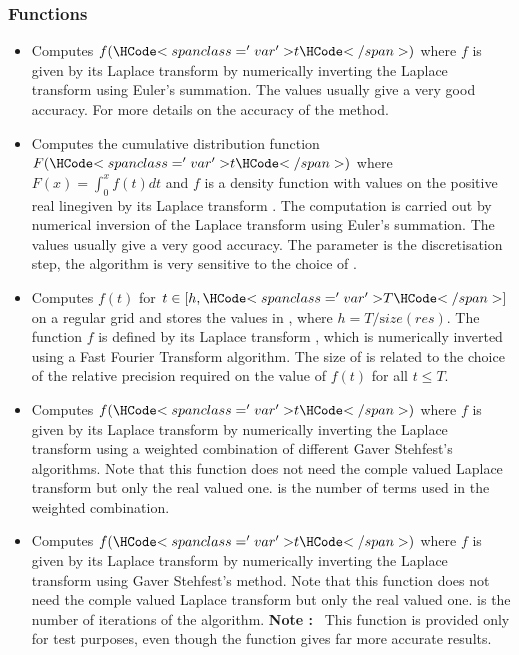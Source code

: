 \subsubsection{Functions}
\begin{itemize}
\item {}
  \sshortdescribe Computes $f(\var{t})$ where $f$ is given by its Laplace
  transform  by numerically inverting the Laplace transform using
  Euler's summation. The values  usually give a very good
  accuracy. For more details on the accuracy of the method. 

\item {}
  \sshortdescribe Computes the cumulative distribution function $F(\var{t})$
  where $F(x) = \int_0^x f(t) dt$ and $f$ is a density function with values on
  the positive real linegiven by its Laplace transform . The
  computation is carried out by numerical inversion of the Laplace transform
  using Euler's summation. The values  usually give a very
  good accuracy. The parameter  is the discretisation step, the
  algorithm is very sensitive to the choice of .

\item {}
  \sshortdescribe Computes $f(t)$ for $t \in [h, \var{T}]$ on a regular grid
  and stores the values in , where $h = T / {\mathrm size}(res)$. The
  function $f$ is defined by its Laplace transform , which is
  numerically inverted using a Fast Fourier Transform algorithm. The size of
   is related to the choice of the relative precision 
  required on the value of $f(t)$ for all $t \le T$.

\item {}
  \sshortdescribe Computes $f(\var{t})$ where $f$ is given by its Laplace
  transform  by numerically inverting the Laplace transform using a
  weighted combination of different Gaver Stehfest's algorithms. Note that
  this function does not need the comple valued Laplace transform but only the
  real valued one.  is the number of terms used in the weighted combination.

\item {}
  \sshortdescribe Computes $f(\var{t})$ where $f$ is given by its Laplace
  transform  by numerically inverting the Laplace transform using
  Gaver Stehfest's method. Note that this function does not
  need the comple valued Laplace transform but only the real valued
  one.  is the number of iterations of the algorithm.
  {\bf Note : }~This function is provided only for test purposes, even though
  the function  gives far more accurate results.
\end{itemize}

